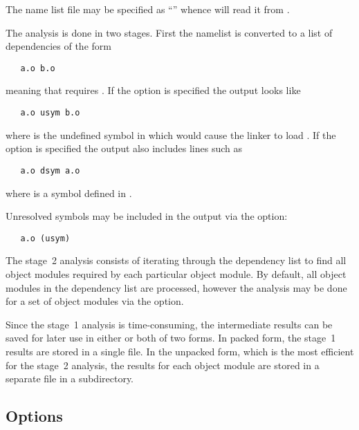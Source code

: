 The name list file may be specified as ``\file{-}'' whence  will
read it from .

The analysis is done in two stages.  First the namelist is converted to a list
of dependencies of the form

\begin{verbatim}
   a.o b.o
\end{verbatim}

\noindent
meaning that  requires .  If the  option is
specified the output looks like

\begin{verbatim}
   a.o usym b.o
\end{verbatim}

\noindent
where  is the undefined symbol in  which would cause the
linker to load .  If the  option is specified the output
also includes lines such as

\begin{verbatim}
   a.o dsym a.o
\end{verbatim}

\noindent
where  is a symbol defined in .

Unresolved symbols may be included in the output via the  option:

\begin{verbatim}
   a.o (usym)
\end{verbatim}

\noindent
The stage~2 analysis consists of iterating through the dependency list to find
all object modules required by each particular object module.  By default, all
object modules in the dependency list are processed, however the analysis may
be done for a set of object modules via the  option.

Since the stage~1 analysis is time-consuming, the intermediate results can be
saved for later use in either or both of two forms.  In packed form, the
stage~1 results are stored in a single file.  In the unpacked form, which is
the most efficient for the stage~2 analysis, the results for each object
module are stored in a separate file in a subdirectory.

\subsection*{Options}

